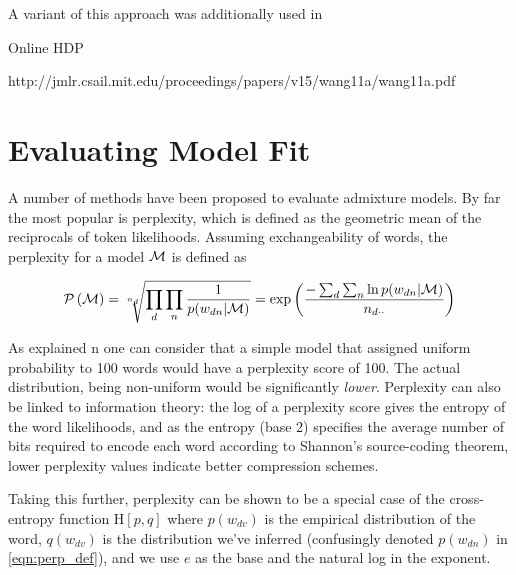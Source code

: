 A variant of this approach was additionally used in \cite{Virtanen2012a}

Online HDP

http://jmlr.csail.mit.edu/proceedings/papers/v15/wang11a/wang11a.pdf



 

\section{Evaluating Model Fit}
\label{sec:chap1:eval}

A number of methods have been proposed to evaluate admixture models. By far the most popular is perplexity, which is defined as the geometric mean of the reciprocals of token likelihoods. Assuming exchangeability of words, the perplexity for a model $\mathcal{M}$ is defined as

\begin{align}
\mathcal{P} \left( { \mathcal{M} } \right) = \sqrt[n_{d}]{\prod_d \prod_n \frac{1}{p(w_{dn}|\mathcal{M})}} = \exp \left( \frac{-\sum_d \sum_n \ln p(w_{dn}|\mathcal{M})}{n_{d\cdot\cdot}} \right) \label{eqn:perp_def}
\end{align}

As explained n \cite{Goodman2001} one can consider that a simple model that assigned uniform probability to 100 words would have a perplexity score of 100. The actual distribution, being non-uniform would be significantly \emph{lower}. Perplexity can also be linked to information theory: the log of a perplexity score gives the entropy of the word likelihoods, and as the entropy (base 2) specifies the average number of bits required to encode each word according to Shannon's source-coding theorem, lower perplexity values indicate better compression schemes.

Taking this further, perplexity can be shown to be a special case of the cross-entropy function $\text{H}[p,q]$ where $p(w_{dv})$ is the empirical distribution of the word, $q(w_{dv})$ is the distribution we've inferred (confusingly denoted $p(w_{dn})$ in \eqref{eqn:perp_def}), and we use $e$ as the base and the natural log in the exponent. 

